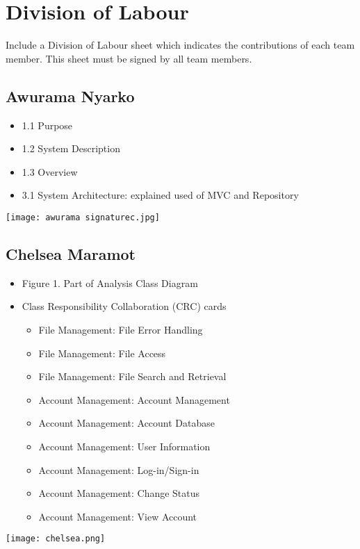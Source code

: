 \documentclass[]{article}
\begin{document}
\appendix
\section{Division of Labour}
\label{sec:division_of_labour}
Include a Division of Labour sheet which indicates the contributions of each team member. This sheet must be signed by all team members.
\subsection{Awurama Nyarko}
\label{subsec:awurama_nyarko}
\begin{itemize}
	\item 1.1 Purpose
	\item 1.2 System Description
	\item 1.3 Overview
	\item 3.1 System Architecture: explained used of MVC and Repository
\end{itemize}
\texttt{[image: awurama signaturec.jpg]}

\subsection{Chelsea Maramot}
\label{subsec:chelsea_maramot}
\begin{itemize}
	\item Figure 1. Part of Analysis Class Diagram
	\item Class Responsibility Collaboration (CRC) cards
 		\begin{itemize}
   			\item File Management: File Error Handling
      			\item File Management: File Access
	 		\item File Management: File Search and Retrieval
    			\item Account Management: Account Management
       			\item Account Management: Account Database
	  		\item Account Management: User Information
     			\item Account Management: Log-in/Sign-in
			\item Account Management: Change Status
   			\item Account Management: View Account
      		\end{itemize}
\end{itemize}
\texttt{[image: chelsea.png]}
\end{document}
